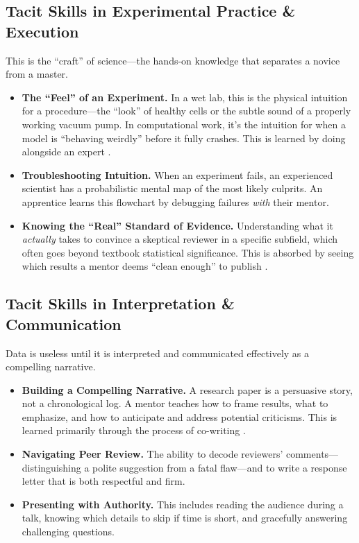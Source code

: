 \subsection{Tacit Skills in Experimental Practice \& Execution}
This is the ``craft'' of science---the hands-on knowledge that separates a novice from a master.
\begin{itemize}[leftmargin=*]
    \item \textbf{The ``Feel'' of an Experiment.} In a wet lab, this is the physical intuition for a procedure---the ``look'' of healthy cells or the subtle sound of a properly working vacuum pump.
    In computational work, it's the intuition for when a model is ``behaving weirdly'' before it fully crashes.
    This is learned by doing alongside an expert \citep{polanyi1966}.
    \item \textbf{Troubleshooting Intuition.} When an experiment fails, an experienced scientist has a probabilistic mental map of the most likely culprits.
    An apprentice learns this flowchart by debugging failures \textit{with} their mentor.
    \item \textbf{Knowing the ``Real'' Standard of Evidence.} Understanding what it \textit{actually} takes to convince a skeptical reviewer in a specific subfield, which often goes beyond textbook statistical significance.
    This is absorbed by seeing which results a mentor deems ``clean enough'' to publish \citep{zuckerman1977}.
\end{itemize}

\subsection{Tacit Skills in Interpretation \& Communication}
Data is useless until it is interpreted and communicated effectively as a compelling narrative.
\begin{itemize}[leftmargin=*]
    \item \textbf{Building a Compelling Narrative.} A research paper is a persuasive story, not a chronological log.
    A mentor teaches how to frame results, what to emphasize, and how to anticipate and address potential criticisms.
    This is learned primarily through the process of co-writing \citep{medawar1979}.
    \item \textbf{Navigating Peer Review.} The ability to decode reviewers' comments---distinguishing a polite suggestion from a fatal flaw---and to write a response letter that is both respectful and firm.
    \item \textbf{Presenting with Authority.} This includes reading the audience during a talk, knowing which details to skip if time is short, and gracefully answering challenging questions.
\end{itemize}
